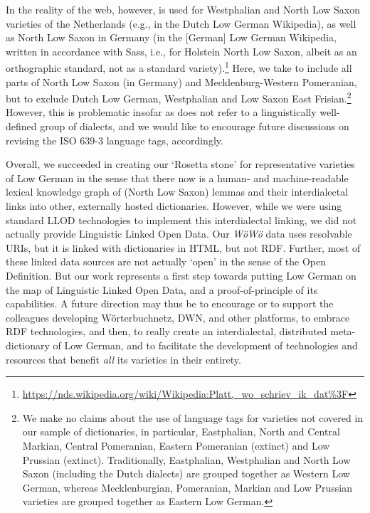{{    } In the reality of the web, however,  is used for Westphalian and North Low Saxon varieties of the Netherlands (e.g., in the Dutch Low German Wikipedia), as well as North Low Saxon in Germany (in the [German] Low German Wikipedia, written in accordance with Sass, i.e.,  for Holstein North Low Saxon, albeit as an orthographic standard, not as a standard variety).\footnote{
        \url{https://nds.wikipedia.org/wiki/Wikipedia:Platt,_wo_schriev_ik_dat\%3F}
    }
    Here, we take  to include all parts of North Low Saxon (in Germany) and Mecklenburg-Western Pomeranian, but to exclude Dutch Low German, Westphalian and Low Saxon East Frisian.\footnote{
      We make no claims about the use of language tags for varieties not covered in our sample of dictionaries, in particular, Eastphalian, North and Central Markian, Central Pomeranian, Eastern Pomeranian (extinct) and Low Prussian (extinct). Traditionally, Eastphalian, Westphalian and North Low Saxon (including the Dutch dialects) are grouped together as Western Low German, whereas Mecklenburgian, Pomeranian, Markian and Low Prussian varieties are grouped together as Eastern Low German.
    }
    However, this is problematic insofar as  does not refer to a linguistically well-defined group of dialects, and we would like to encourage future discussions on revising the ISO 639-3 language tags, accordingly.
}

Overall, we succeeded in creating our `Rosetta stone' for representative varieties of Low German in the sense that there now is a human- and machine-readable lexical knowledge graph of (North Low Saxon) lemmas and their interdialectal links into other, externally hosted dictionaries.
However, while we were using standard LLOD technologies to implement this interdialectal linking, we did not actually provide Linguistic Linked Open Data. Our \emph{WöWö} data uses resolvable URIs, but it is linked with dictionaries in HTML, but not RDF. 
Further, most of these linked data sources are not actually `open' in the sense of the Open Definition. 
But our work represents a first step towards putting Low German on the map of Linguistic Linked Open Data, and a proof-of-principle of its capabilities.
A future direction may thus be to encourage or to support the colleagues developing Wörterbuchnetz, DWN, and other platforms, to embrace RDF technologies, and then, to really create an interdialectal, distributed meta-dictionary of Low German, and to facilitate the development of technologies and resources that benefit \emph{all} its varieties in their entirety.

